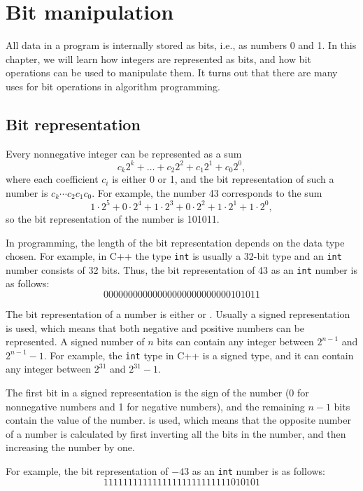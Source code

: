 \chapter{Bit manipulation}

All data in a program is internally stored as bits,
i.e., as numbers 0 and 1.
In this chapter, we will learn how integers
are represented as bits, and how bit operations
can be used to manipulate them.
It turns out that there are many uses for
bit operations in algorithm programming.

\section{Bit representation}


Every nonnegative integer can be represented as a sum
\[c_k 2^k + \ldots + c_2 2^2 + c_1 2^1 + c_0 2^0,\]
where each coefficient $c_i$ is either 0 or 1,
and the bit representation of such a number is
$c_k \cdots c_2 c_1 c_0$.
For example, the number 43 corresponds to the sum
\[1 \cdot 2^5 + 0 \cdot 2^4 + 1 \cdot 2^3 + 0 \cdot 2^2 + 1 \cdot 2^1 + 1 \cdot 2^0,\]
so the bit representation of the number is 101011.

In programming, the length of the bit representation
depends on the data type chosen.
For example, in C++ the type \texttt{int} is
usually a 32-bit type and an \texttt{int} number
consists of 32 bits.
Thus, the bit representation of 43
as an \texttt{int} number is as follows:
\[00000000000000000000000000101011\]

The bit representation of a number is either
 or .
Usually a signed representation is used,
which means that both negative and positive
numbers can be represented.
A signed number of $n$ bits can contain any
integer between $2^{n-1}$ and $2^{n-1}-1$.
For example, the \texttt{int} type in C++ is
a signed type, and it can contain any
integer between $2^{31}$ and $2^{31}-1$.

The first bit in a signed representation
is the sign of the number (0 for nonnegative numbers
and 1 for negative numbers), and
the remaining $n-1$ bits contain the value of the number.
 is used, which means that the
opposite number of a number is calculated by first
inverting all the bits in the number,
and then increasing the number by one.

For example, the bit representation of $-43$
as an \texttt{int} number is as follows:
\[11111111111111111111111111010101\]

